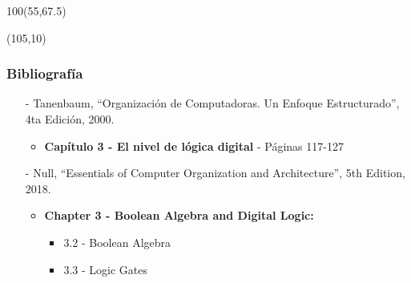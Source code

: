 \documentclass[aspectratio=169]{beamer}
\begin{document}
\begin{frame}[fragile]
    \begin{textblock}{100}(55,67.5)  \end{textblock}
    \begin{textblock}{50}(105,10) 
    \end{textblock}
\end{frame}

\begin{frame}[fragile]
    \frametitle{Bibliografía}
    \begin{itemize}
     \setlength\itemsep{0.5cm}
    \item[-] \small Tanenbaum, “Organización de Computadoras. Un Enfoque Estructurado”, 4ta Edición, 2000.\\
    \begin{itemize}
     \item \textbf{Capítulo 3 - El nivel de lógica digital} - Páginas 117-127
    \end{itemize}
    \item[-] \small Null, “Essentials of Computer Organization and Architecture”, 5th Edition, 2018.\\
    \begin{itemize}
     \item \textbf{Chapter 3 - Boolean Algebra and Digital Logic:}
     \begin{itemize}
     \item 3.2 - Boolean Algebra
     \item 3.3 - Logic Gates
     \end{itemize}
    \end{itemize}
    \end{itemize}
\end{frame}
\end{document}

